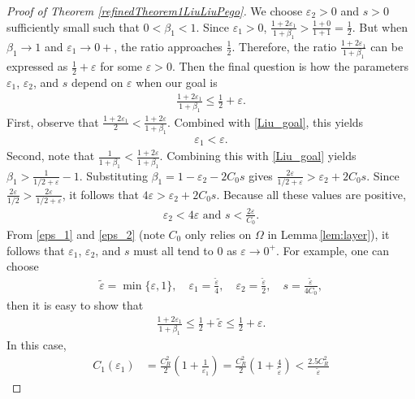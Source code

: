\documentclass{article}
\theoremstyle{definition}                   %
\begin{document}
\begin{proof}[Proof of Theorem \ref{refinedTheorem1LiuLiuPego}]
We choose $\varepsilon_2>0$ and $s>0$ sufficiently small such that $0<\beta_1<1$.  Since $\varepsilon_1>0$,
$\frac{1+2\varepsilon_1}{1+\beta_1} > \frac{1+0}{1+1}=\frac{1}{2}$. But when $\beta_1\to 1$ and $\varepsilon_1\to 0+$, the ratio approaches $\frac{1}{2}$. Therefore, the ratio $\frac{1+2\varepsilon_1}{1+\beta_1}$ can be expressed as $\frac{1}{2} + \varepsilon$ for some $\varepsilon>0$. Then the final question is how the parameters $\varepsilon_1$, $\varepsilon_2$, and $s$ depend on $\varepsilon$ when our goal is 
\begin{align}
\frac{1+2\varepsilon_1}{1+\beta_1}\le \frac12+\varepsilon.
\label{Liu_goal}
\end{align}
%
First, observe that $\frac{1+2\varepsilon_1}{2} < \frac{1+2\varepsilon}{1+\beta_1}$. Combined with \eqref{Liu_goal}, this yields 
\begin{align}
\varepsilon_1<\varepsilon.
\label{eps_1}
\end{align}
%
Second, note that $\frac{1}{1+\beta_1}<\frac{1+2\varepsilon}{1+\beta_1}$. Combining this with \eqref{Liu_goal} yields $\beta_1>\frac{1}{1/2+\varepsilon} -1$. Substituting $\beta_1=1-\varepsilon_2 - 2C_0s$ gives $\frac{2\varepsilon}{1/2+\varepsilon}>\varepsilon_2 + 2C_0s$. Since $\frac{2\varepsilon}{1/2} > \frac{2\varepsilon}{1/2+\varepsilon}$, it follows that $4\varepsilon>\varepsilon_2 + 2C_0s$. Because all these values are positive,  
\begin{align}
\varepsilon_2 < 4\varepsilon
\text{ and }
s<\frac{2\varepsilon}{C_0}.
\label{eps_2}
\end{align} 
From \eqref{eps_1} and \eqref{eps_2} (note $C_0$ only relies on $\Omega$ in Lemma\,\ref{lem:layer}), it follows that $\varepsilon_1$, $\varepsilon_2$, and $s$ must all tend to $0$ as $\varepsilon \to 0^+$.
For example, one can choose 
\begin{align}
\tilde{\varepsilon}=\min\{\varepsilon, 1\}, 
\quad
\varepsilon_1= \frac{\tilde\varepsilon}{4}, 
\quad
\varepsilon_2=\frac{\tilde\varepsilon}{2},
\quad
s=\frac{\tilde\varepsilon}{4C_0},
\label{Liu_choice}
\end{align}
then
it is easy to show that  
\begin{align}
\frac{1+2\varepsilon_1}{1+\beta_1}\le \frac12+\tilde\varepsilon  \le \frac{1}{2}+ \varepsilon.
\label{Liu002}
\end{align}
In this case, 
\begin{align}
C_1(\varepsilon_1)&=\frac{C_R^2}{2} (1+\frac{1}{\varepsilon_1})=\frac{C_R^2}{2} ( 1+\frac{4}{\tilde\varepsilon}) 
<\frac{2.5 C_R^2}{\tilde\varepsilon}

\end{align}
\end{proof}
\end{document}
